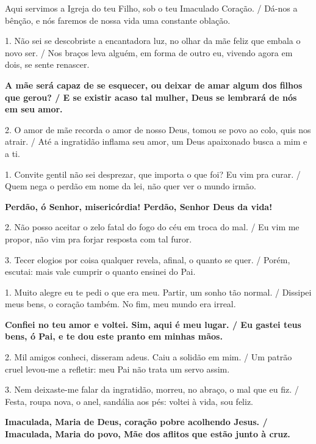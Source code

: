 \documentclass[a5paper,9pt]{extarticle}
\begin{document}
\begin{cantos}
\begin{canto}
Aqui servimos a Igreja do teu Filho, sob o teu Imaculado Coração. / Dá-nos a bênção, e nós faremos de nossa vida uma constante oblação.
\end{canto}

\begin{canto}
1. Não sei se descobriste a encantadora luz, no olhar da mãe feliz que embala o novo ser. / Nos braços leva alguém, em forma de outro eu, vivendo agora em dois, se sente renascer.

\textbf{A mãe será capaz de se esquecer, ou deixar de amar algum dos filhos que gerou? / E se existir acaso tal mulher, Deus se lembrará de nós em seu amor.}

2. O amor de mãe recorda o amor de nosso Deus, tomou se povo ao colo, quis nos atrair. / Até a ingratidão inflama seu amor, um Deus apaixonado busca a mim e a ti.
\end{canto}

\begin{canto}
1. Convite gentil não sei desprezar, que importa o que foi? Eu vim pra curar. / Quem nega o perdão em nome da lei, não quer ver o mundo irmão.

\textbf{Perdão, ó Senhor, misericórdia! Perdão, Senhor Deus da vida! }

2. Não posso aceitar o zelo fatal do fogo do céu em troca do mal. / Eu vim me propor, não vim pra forjar resposta com tal furor.

3. Tecer elogios por coisa qualquer revela, afinal, o quanto se quer. / Porém, escutai: mais vale cumprir o quanto ensinei do Pai.
\end{canto}

\begin{canto}
1. Muito alegre eu te pedi o que era meu. Partir, um sonho tão normal. / Dissipei meus bens, o coração também. No fim, meu mundo era irreal.

\textbf{Confiei no teu amor e voltei. Sim, aqui é meu lugar. / Eu gastei teus bens, ó Pai, e te dou este pranto em minhas mãos.}

2. Mil amigos conheci, disseram adeus. Caiu a solidão em mim. / Um patrão cruel levou-me a refletir: meu Pai não trata um servo assim.

3. Nem deixaste-me falar da ingratidão, morreu, no abraço, o mal que eu fiz. / Festa, roupa nova, o anel, sandália aos pés: voltei à vida, sou feliz.
\end{canto}

\begin{canto}
\textbf{Imaculada, Maria de Deus, coração pobre acolhendo Jesus. / Imaculada, Maria do povo, Mãe dos aflitos que estão junto à cruz.}


\end{canto}
\end{cantos}
\end{document}
